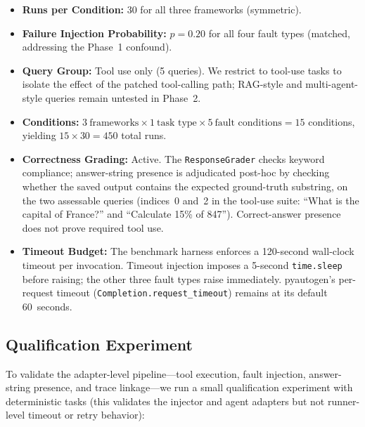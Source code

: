 \documentclass[make,article,submit,moreauthors,pdftex]{mdpi}
\begin{document}
\begin{itemize}
  \item \textbf{Runs per Condition:} 30 for all three frameworks (symmetric).
  \item \textbf{Failure Injection Probability:} $p = 0.20$ for all four fault types (matched, addressing the Phase~1 confound).
  \item \textbf{Query Group:} Tool use only (5 queries). We restrict to tool-use tasks to isolate the effect of the patched tool-calling path; RAG-style and multi-agent-style queries remain untested in Phase~2.
  \item \textbf{Conditions:} $3~\text{frameworks} \times 1~\text{task type} \times 5~\text{fault conditions} = 15$ conditions, yielding $15 \times 30 = 450$ total runs.
  \item \textbf{Correctness Grading:} Active. The \texttt{ResponseGrader} checks keyword compliance; answer-string presence is adjudicated post-hoc by checking whether the saved output contains the expected ground-truth substring, on the two assessable queries (indices~0 and~2 in the tool-use suite: ``What is the capital of France?'' and ``Calculate 15\% of 847''). Correct-answer presence does not prove required tool use.
  \item \textbf{Timeout Budget:} The benchmark harness enforces a 120-second wall-clock timeout per invocation. Timeout injection imposes a 5-second \texttt{time.sleep} before raising; the other three fault types raise immediately. pyautogen's per-request timeout (\texttt{Completion.request\_timeout}) remains at its default 60~seconds.
\end{itemize}

\subsection{Qualification Experiment}\label{sec:qualification-method}

{\color{magenta}To validate the adapter-level pipeline---tool execution, fault injection, answer-string presence, and trace linkage---we run a small qualification experiment with deterministic tasks (this validates the injector and agent adapters but not runner-level timeout or retry behavior):}
\end{document}
